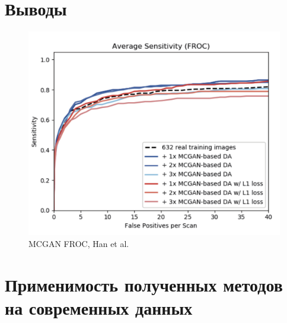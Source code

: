 \section{Выводы}

\begin{figure}[!h]
\includegraphics[width=\linewidth]{images/mcgan-results.png}
\caption{MCGAN FROC, Han et al. \cite{mcgan-augmentation}}\label{mcgan}
\centering
\end{figure}


\section{Применимость полученных методов на современных данных}
